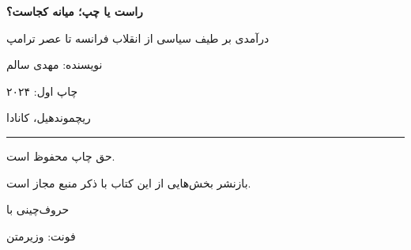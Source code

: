\begin{center}
{\large\textbf{راست یا چپ؛ میانه کجاست؟}}

\vspace{3mm}

{\normalsize درآمدی بر طیف سیاسی از انقلاب فرانسه تا عصر ترامپ}

\vspace{10mm}

نویسنده: مهدی سالم

\vspace{5mm}

چاپ اول: ۲۰۲۴

\vspace{5mm}

ریچموندهیل، کانادا

\vspace{20mm}

\rule{0.3\textwidth}{0.5pt}

\vspace{5mm}

{\footnotesize
حق چاپ محفوظ است.

بازنشر بخش‌هایی از این کتاب با ذکر منبع مجاز است.
}

\vspace{10mm}

{\small حروف‌چینی با \XeLaTeX}

{\small فونت: وزیرمتن}

\end{center}

\vspace*{\fill}